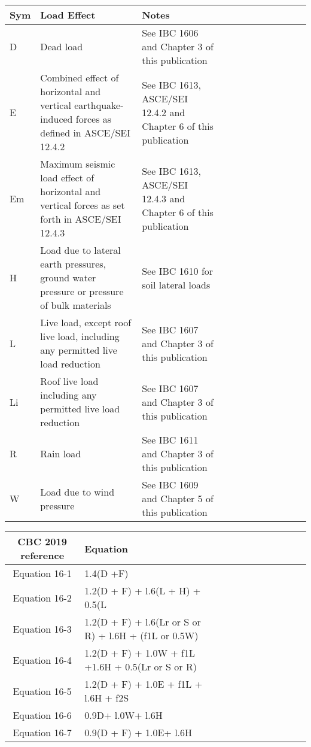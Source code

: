 \documentclass[12pt,notitle,letterpaper]{report}
\begin{document}
 \begin{tabulary}{1.0\textwidth}{leftleftleft}
\hline
 Sym   & Load Effect               & Notes   \\
\hline
 D     & Dead load                 & See IBC 1606 and Chapter 3 of
this publication         \\
 E     & Combined effect of horizontal
and vertical earthquake-
induced forces as defined in
ASCE/SEI 12.4.2                           & See IBC 1613, ASCE/SEI 12.4.2
and Chapter 6 of this
publication         \\
 Em    & Maximum seismic load effect of
horizontal and vertical forces
as set forth in ASCE/SEI
12.4.3                           & See IBC 1613, ASCE/SEI 12.4.3
and Chapter 6 of this
publication         \\
 H     & Load due to lateral earth
pressures, ground water
pressure or pressure of bulk
materials                           & See IBC 1610 for soil lateral
loads         \\
 L     & Live load, except roof live
load, including any permitted
live load reduction                           & See IBC 1607 and Chapter 3 of
this publication         \\
 Li    & Roof live load including any
permitted live load reduction                           & See IBC 1607 and Chapter 3 of
this publication         \\
 R     & Rain load                 & See IBC 1611 and Chapter 3 of
this publication         \\
 W     & Load due to wind pressure & See IBC 1609 and Chapter 5 of
this publication         \\
\hline
\end{tabulary}
\vspace{.15in}

 \begin{tabulary}{1.0\textwidth}{centercenter}
\hline
  CBC 2019 reference  &                        Equation                       \\
\hline
    Equation 16-1     &                       1.4(D +F)                       \\
    Equation 16-2     &            1.2(D + F) + l.6(L + H) + 0.5(L            \\
    Equation 16-3     & 1.2(D + F) + l.6(Lr or S or R) + l.6H + (f1L or 0.5W) \\
    Equation 16-4     &   1.2(D + F) + 1.0W + f1L +1.6H + 0.5(Lr or S or R)   \\
    Equation 16-5     &         1.2(D + F) + 1.0E + f1L + l.6H + f2S          \\
    Equation 16-6     &                   0.9D+ l.0W+ l.6H                    \\
    Equation 16-7     &                0.9(D + F) + 1.0E+ l.6H                \\
\hline
\end{tabulary}
\vspace{.15in}
\end{document}
